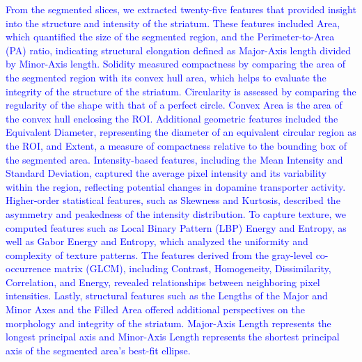 \documentclass{article}
\begin{document}
\textcolor{blue}{From the segmented slices, we extracted twenty-five features that provided insight into the structure and intensity of the striatum. These features included Area, which quantified the size of the segmented region, and the Perimeter-to-Area (PA) ratio, indicating structural elongation defined as Major-Axis length divided by Minor-Axis length. Solidity measured compactness by comparing the area of the segmented region with its convex hull area, which helps to evaluate the integrity of the structure of the striatum. Circularity is assessed by comparing the regularity of the shape with that of a perfect circle. Convex Area is the area of the convex hull enclosing the ROI. Additional geometric features included the Equivalent Diameter, representing the diameter of an equivalent circular region as the ROI, and Extent, a measure of compactness relative to the bounding box of the segmented area. Intensity-based features, including the Mean Intensity and Standard Deviation, captured the average pixel intensity and its variability within the region, reflecting potential changes in dopamine transporter activity. Higher-order statistical features, such as Skewness and Kurtosis, described the asymmetry and peakedness of the intensity distribution. To capture texture, we computed features such as Local Binary Pattern (LBP) Energy and Entropy, as well as Gabor Energy and Entropy, which analyzed the uniformity and complexity of texture patterns. The features derived from the gray-level co-occurrence matrix (GLCM), including Contrast, Homogeneity, Dissimilarity, Correlation, and Energy, revealed relationships between neighboring pixel intensities. Lastly, structural features such as the Lengths of the Major and Minor Axes and the Filled Area offered additional perspectives on the morphology and integrity of the striatum. Major-Axis Length represents the longest principal axis and Minor-Axis Length represents the shortest principal axis of the segmented area's best-fit ellipse.}
\end{document}
